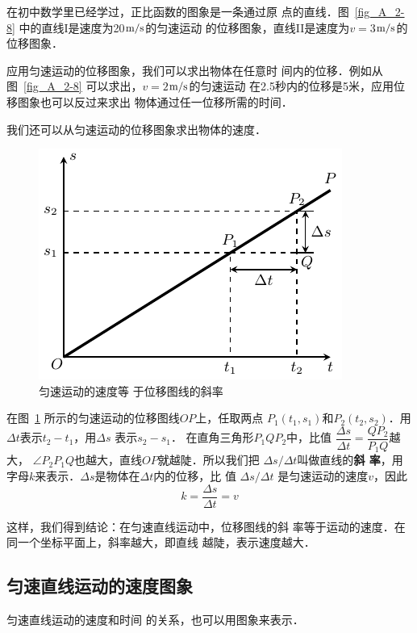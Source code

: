 在初中数学里已经学过，正比函数的图象是一条通过原
点的直线．图~\ref{fig_A_2-8} 中的直线I是速度为20$\text{m}/\text{s}$的匀速运动
的位移图象，直线II是速度为$v=3$$\text{m}/\text{s}$的位移图象．


    应用匀速运动的位移图象，我们可以求出物体在任意时
间内的位移．例如从图~\ref{fig_A_2-8} 可以求出，$v=2$$\text{m}/\text{s}$的匀速运动
在2.5秒内的位移是5米，应用位移图象也可以反过来求出
物体通过任一位移所需的时间．


我们还可以从匀速运动的位移图象求出物体的速度．

\begin{figure}[htp]
    \centering
    \includegraphics{fig/A/2-9.pdf}
    \caption{匀速运动的速度等
    于位移图线的斜率}\label{fig_A_2-9}
\end{figure}

    在图~\ref{fig_A_2-9} 所示的匀速运动的位移图线$OP$上，任取两点
    $P_1(t_1,s_1)$和$P_2(t_2,s_2)$．用$\Delta t$表示$t_2-t_1$，用$\Delta s$
    表示$s_2-s_1$．
    在直角三角形$P_1QP_2$中，比值
    $\dfrac{\Delta s}{\Delta t}=\dfrac{QP_2}{P_1Q}$越大，
$\angle P_2P_1Q$也越大，直线$OP$就越陡．所以我们把
$\Delta s/\Delta t$叫做直线的\textbf{斜
率}，用字母$k$来表示．$\Delta s$是物体在$\Delta t$内的位移，比
值 $\Delta s/\Delta t$
是匀速运动的速度$v$，因此
\[k=\frac{\Delta s}{\Delta t}=v\]

这样，我们得到结论：在匀速直线运动中，位移图线的斜
率等于运动的速度．在同一个坐标平面上，斜率越大，即直线
越陡，表示速度越大．

 
\subsection{匀速直线运动的速度图象} 

匀速直线运动的速度和时间
的关系，也可以用图象来表示．

